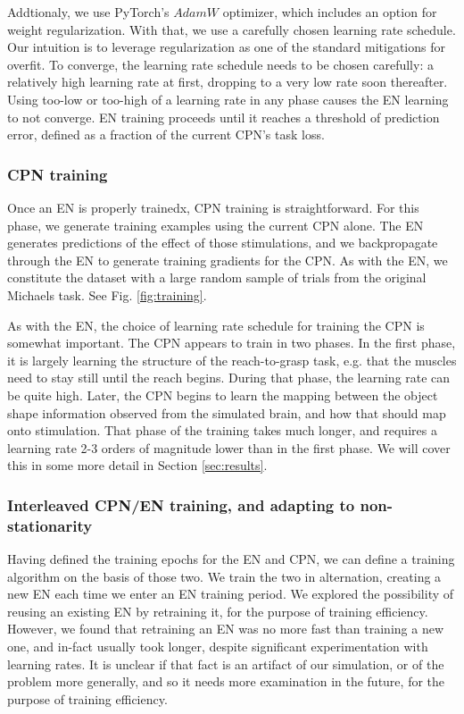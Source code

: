 \documentclass[12pt]{iopart}
\begin{document}
Addtionaly, we use PyTorch's $AdamW$ optimizer, which includes an option for weight regularization.
With that, we use a carefully chosen learning rate schedule. Our intuition is to leverage regularization as
one of the standard mitigations for overfit. To converge, the learning rate schedule needs
to be chosen carefully: a relatively high learning rate at first, dropping to a very low rate soon
thereafter. Using too-low or too-high of a learning rate in any phase causes the EN learning
to not converge. EN training proceeds until it reaches a threshold of prediction error, defined as
a fraction of the current CPN's task loss.

\subsubsection{CPN training}
Once an EN is properly trainedx, CPN training is straightforward. For this phase,
we generate training examples using the current CPN alone. The EN generates predictions of the
effect of those stimulations, and we backpropagate through the EN to generate training gradients
for the CPN. As with the EN, we constitute the dataset with a large random sample of trials from
the original Michaels task. See Fig. \ref{fig:training}.

As with the EN, the choice of learning rate schedule for training the CPN is somewhat important.
The CPN appears to train in two phases. In the first phase, it is largely learning the structure
of the reach-to-grasp task, e.g. that the muscles need to stay still until the reach begins. During
that phase, the learning rate can be quite high. Later, the CPN begins to learn the mapping between
the object shape information observed from the simulated brain, and how that should map onto
stimulation. That phase of the training takes much longer, and requires a learning rate 2-3
orders of magnitude lower than in the first phase. We will cover this in some more detail in
Section \ref{sec:results}.

\subsubsection{Interleaved CPN/EN training, and adapting to non-stationarity}
Having defined the training epochs for the EN and CPN, we can define a training
algorithm on the basis of those two. We train the two in alternation, creating
a new EN each time we enter an EN training period. We explored the possibility
of reusing an existing EN by retraining it, for the purpose of training efficiency.
However, we found that retraining an EN was no more fast than training a new one,
and in-fact usually took longer, despite significant experimentation with learning
rates. It is unclear if that fact is an artifact of our simulation, or of the
problem more generally, and so it needs more examination in the future, for the
purpose of training efficiency.
\end{document}
